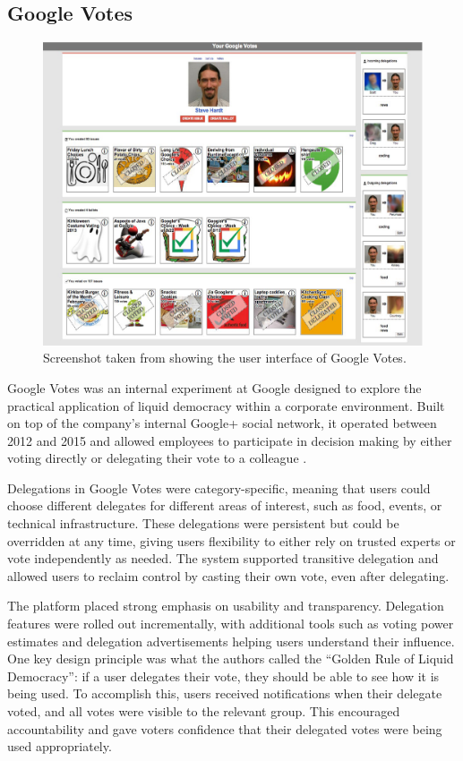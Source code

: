 \subsection{Google Votes}
\begin{figure}[H]
  \centering
  \includegraphics[width=0.8\linewidth]{../common/google_votes.png}
  \caption{Screenshot taken from \citet{hardt_google_2015} showing the user interface of Google Votes.}
\end{figure}

Google Votes was an internal experiment at Google designed to explore the practical application of liquid democracy within a corporate environment. Built on top of the company's internal Google+ social network, it operated between 2012 and 2015 and allowed employees to participate in decision making by either voting directly or delegating their vote to a colleague \citep{hardt_google_2015}.

Delegations in Google Votes were category-specific, meaning that users could choose different delegates for different areas of interest, such as food, events, or technical infrastructure. These delegations were persistent but could be overridden at any time, giving users flexibility to either rely on trusted experts or vote independently as needed. The system supported transitive delegation and allowed users to reclaim control by casting their own vote, even after delegating.

The platform placed strong emphasis on usability and transparency. Delegation features were rolled out incrementally, with additional tools such as voting power estimates and delegation advertisements helping users understand their influence. One key design principle was what the authors called the ``Golden Rule of Liquid Democracy'': if a user delegates their vote, they should be able to see how it is being used. To accomplish this, users received notifications when their delegate voted, and all votes were visible to the relevant group. This encouraged accountability and gave voters confidence that their delegated votes were being used appropriately.

